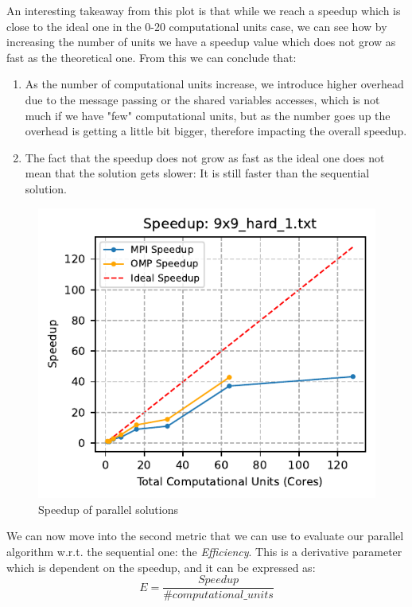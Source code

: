 An interesting takeaway from this plot is that while we reach a speedup which is close to the ideal one in the 0-20 computational units case, we can see how by increasing the number of units we have a speedup value which does not grow as fast as the theoretical one. From this we can conclude that:
\begin{enumerate}
    \item As the number of computational units increase, we introduce higher overhead due to the message passing or the shared variables accesses, which is not much if we have "few" computational units, but as the number goes up the overhead is getting a little bit bigger, therefore impacting the overall speedup.
    \item The fact that the speedup does not grow as fast as the ideal one does not mean that the solution gets slower: It is still faster than the sequential solution.
\end{enumerate}


\begin{figure}[htbp]
\centering
\includegraphics[width=0.9\linewidth]{imgs/comparison_speedup_9x9_hard_1.pdf}
\caption{Speedup of parallel solutions}
\label{fig:speedup_9x9}
\end{figure}

We can now move into the second metric that we can use to evaluate our parallel algorithm w.r.t. the sequential one: the \textit{Efficiency}. This is a derivative parameter which is dependent on the speedup, and it can be expressed as:
\[
E = \frac{Speedup}{\# computational\_units}
\]

